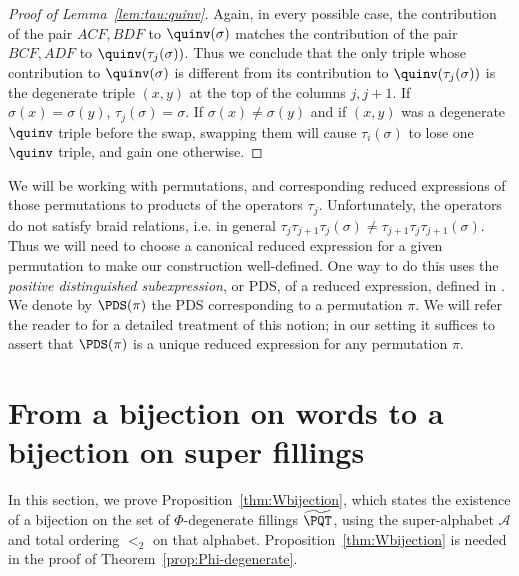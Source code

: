 \begin{proof}[Proof of Lemma~\ref{lem:tau:quinv}]
\medskip
Again, in every possible case, the contribution of the pair $ACF, BDF$ to $\quinv(\sigma)$ matches the contribution of the pair $BCF, ADF$ to $\quinv(\tau_j(\sigma))$. Thus we conclude that the only triple whose contribution to $\quinv(\sigma)$ is different from its contribution to $\quinv(\tau_j(\sigma))$ is the degenerate triple $(x,y)$ at the top of the columns $j,j+1$. If $\sigma(x)=\sigma(y)$, $\tau_j(\sigma)=\sigma$. If $\sigma(x)\neq \sigma(y)$ and if $(x,y)$ was a degenerate $\quinv$ triple before the swap, swapping them will cause $\tau_i(\sigma)$ to lose one $\quinv$ triple, and gain one otherwise. 
\end{proof}

\begin{remark}\label{rem:PDS}
We will be working with permutations, and corresponding reduced expressions of those permutations to products of the operators $\tau_j$. Unfortunately, the operators do not satisfy braid relations, i.e. in general $\tau_j\tau_{j+1}\tau_j(\sigma) \neq \tau_{j+1}\tau_j\allowbreak \tau_{j+1}(\sigma)$. Thus we will need to choose a canonical reduced expression for a given permutation to make our construction well-defined. One way to do this uses the \emph{positive distinguished subexpression}, or PDS, of a reduced expression, defined in \cite{MarshRietsch}. We denote by $\PDS(\pi)$ the PDS corresponding to a permutation $\pi$. We will refer the reader to \cite[Section 3]{compactformula} for a detailed treatment of this notion; in our setting it suffices to assert that $\PDS(\pi)$ is a unique reduced expression for any permutation $\pi$.
\end{remark} 

\section{From a bijection on words to a bijection on 
super fillings}
\label{sec:bijPQT}

In this section, we prove Proposition~\ref{thm:Wbijection}, which states the existence of a bijection on the set of $\Phi$-degenerate fillings $\widetilde{\PQT}$, using the super-alphabet $\mathcal{A}$ and total ordering $<_2$ on that alphabet. Proposition~\ref{thm:Wbijection} is needed in the proof of Theorem~\ref{prop:Phi-degenerate}.

